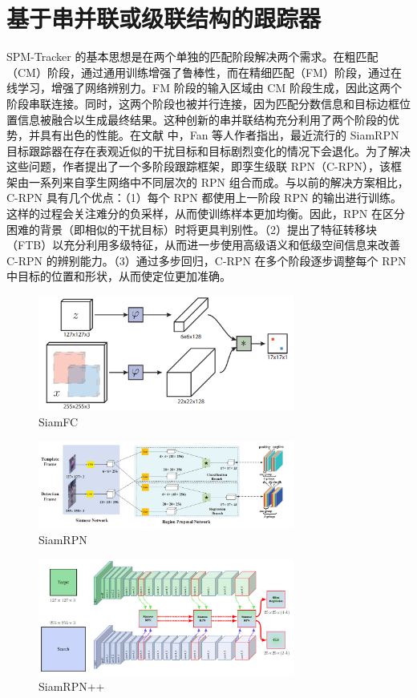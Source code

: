 \section{基于串并联或级联结构的跟踪器}
SPM-Tracker \cite{SPM} 的基本思想是在两个单独的匹配阶段解决两个需求。在粗匹配（CM）阶段，通过通用训练增强了鲁棒性，而在精细匹配（FM）阶段，通过在线学习，增强了网络辨别力。FM 阶段的输入区域由 CM 阶段生成，因此这两个阶段串联连接。同时，这两个阶段也被并行连接，因为匹配分数信息和目标边框位置信息被融合以生成最终结果。这种创新的串并联结构充分利用了两个阶段的优势，并具有出色的性能。在文献 \cite{fan2019siamese} 中，Fan 等人作者指出，最近流行的 SiamRPN \cite{SiamRPN} 目标跟踪器在存在表观近似的干扰目标和目标剧烈变化的情况下会退化。为了解决这些问题，作者提出了一个多阶段跟踪框架，即孪生级联 RPN（C-RPN），该框架由一系列来自孪生网络中不同层次的 RPN 组合而成。与以前的解决方案相比，C-RPN 具有几个优点：（1）每个 RPN 都使用上一阶段 RPN 的输出进行训练。这样的过程会关注难分的负采样，从而使训练样本更加均衡。因此，RPN 在区分困难的背景（即相似的干扰目标）时将更具判别性。（2）提出了特征转移块（FTB）以充分利用多级特征，从而进一步使用高级语义和低级空间信息来改善 C-RPN 的辨别能力。（3）通过多步回归，C-RPN 在多个阶段逐步调整每个 RPN 中目标的位置和形状，从而使定位更加准确。
\iffalse
\begin{figure}
\centering
\includegraphics[width=0.75\textwidth]{Img/related/SiamFC.png}
\caption{SiamFC}
\end{figure}

\begin{figure}
\centering
\includegraphics[width=0.75\textwidth]{Img/related/SiamRPN.png}
\caption{SiamRPN}
\end{figure}

\begin{figure}
\centering
\includegraphics[width=0.75\textwidth]{Img/related/SiamRPN++.png}
\caption{SiamRPN++}
\end{figure}

